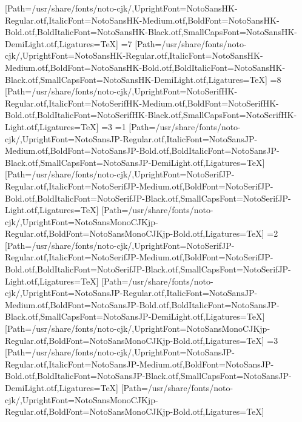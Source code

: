 [Path=/usr/share/fonts/noto-cjk/,UprightFont=NotoSansHK-Regular.otf,ItalicFont=NotoSansHK-Medium.otf,BoldFont=NotoSansHK-Bold.otf,BoldItalicFont=NotoSansHK-Black.otf,SmallCapsFont=NotoSansHK-DemiLight.otf,Ligatures=TeX]
\else\ifnum\value{CJKFonts}=7
[Path=/usr/share/fonts/noto-cjk/,UprightFont=NotoSansHK-Regular.otf,ItalicFont=NotoSansHK-Medium.otf,BoldFont=NotoSansHK-Bold.otf,BoldItalicFont=NotoSansHK-Black.otf,SmallCapsFont=NotoSansHK-DemiLight.otf,Ligatures=TeX]
\else\ifnum\value{CJKFonts}=8
[Path=/usr/share/fonts/noto-cjk/,UprightFont=NotoSerifHK-Regular.otf,ItalicFont=NotoSerifHK-Medium.otf,BoldFont=NotoSerifHK-Bold.otf,BoldItalicFont=NotoSerifHK-Black.otf,SmallCapsFont=NotoSerifHK-Light.otf,Ligatures=TeX]
\fi\fi\fi\fi\fi\fi\fi\fi\else
\ifnum\value{CJKLanguage}=3
\ifnum\value{CJKFonts}=1
[Path=/usr/share/fonts/noto-cjk/,UprightFont=NotoSansJP-Regular.otf,ItalicFont=NotoSansJP-Medium.otf,BoldFont=NotoSansJP-Bold.otf,BoldItalicFont=NotoSansJP-Black.otf,SmallCapsFont=NotoSansJP-DemiLight.otf,Ligatures=TeX]
[Path=/usr/share/fonts/noto-cjk/,UprightFont=NotoSerifJP-Regular.otf,ItalicFont=NotoSerifJP-Medium.otf,BoldFont=NotoSerifJP-Bold.otf,BoldItalicFont=NotoSerifJP-Black.otf,SmallCapsFont=NotoSerifJP-Light.otf,Ligatures=TeX]
[Path=/usr/share/fonts/noto-cjk/,UprightFont=NotoSansMonoCJKjp-Regular.otf,BoldFont=NotoSansMonoCJKjp-Bold.otf,Ligatures=TeX]
\else\ifnum\value{CJKFonts}=2
[Path=/usr/share/fonts/noto-cjk/,UprightFont=NotoSerifJP-Regular.otf,ItalicFont=NotoSerifJP-Medium.otf,BoldFont=NotoSerifJP-Bold.otf,BoldItalicFont=NotoSerifJP-Black.otf,SmallCapsFont=NotoSerifJP-Light.otf,Ligatures=TeX]
[Path=/usr/share/fonts/noto-cjk/,UprightFont=NotoSansJP-Regular.otf,ItalicFont=NotoSansJP-Medium.otf,BoldFont=NotoSansJP-Bold.otf,BoldItalicFont=NotoSansJP-Black.otf,SmallCapsFont=NotoSansJP-DemiLight.otf,Ligatures=TeX]
[Path=/usr/share/fonts/noto-cjk/,UprightFont=NotoSansMonoCJKjp-Regular.otf,BoldFont=NotoSansMonoCJKjp-Bold.otf,Ligatures=TeX]
\else\ifnum\value{CJKFonts}=3
[Path=/usr/share/fonts/noto-cjk/,UprightFont=NotoSansJP-Regular.otf,ItalicFont=NotoSansJP-Medium.otf,BoldFont=NotoSansJP-Bold.otf,BoldItalicFont=NotoSansJP-Black.otf,SmallCapsFont=NotoSansJP-DemiLight.otf,Ligatures=TeX]
[Path=/usr/share/fonts/noto-cjk/,UprightFont=NotoSansMonoCJKjp-Regular.otf,BoldFont=NotoSansMonoCJKjp-Bold.otf,Ligatures=TeX]
